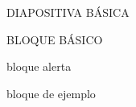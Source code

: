 \begin{frame}{DIAPOSITIVA BÁSICA}
\begin{block}{BLOQUE BÁSICO}
\end{block}

\begin{alertblock}{bloque alerta}

\end{alertblock}

\begin{exampleblock}{bloque de ejemplo}

\end{exampleblock}

\end{frame}